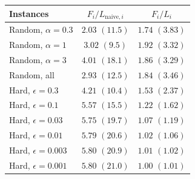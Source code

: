 \begin{tabular}{l|cc}
\toprule
Instances & $F_i / L_{\mathrm{naive}, i}$ & $F_i / L_i$ \\
\hline
Random, $\alpha = 0.3$ & $2.03$ $(11.5)$ & $1.74$ $(3.83)$ \\
Random, $\alpha = 1$ & $3.02$ $(9.5)$ & $1.92$ $(3.32)$ \\
Random, $\alpha = 3$ & $4.01$ $(18.1)$ & $1.86$ $(3.29)$ \\
Random, all & $2.93$ $(12.5)$ & $1.84$ $(3.46)$ \\
\hline
Hard, $\epsilon = 0.3$ & $4.21$ $(10.4)$ & $1.53$ $(2.37)$ \\
Hard, $\epsilon = 0.1$ & $5.57$ $(15.5)$ & $1.22$ $(1.62)$ \\
Hard, $\epsilon = 0.03$ & $5.75$ $(19.7)$ & $1.07$ $(1.19)$ \\
Hard, $\epsilon = 0.01$ & $5.79$ $(20.6)$ & $1.02$ $(1.06)$ \\
Hard, $\epsilon = 0.003$ & $5.80$ $(20.9)$ & $1.01$ $(1.02)$ \\
Hard, $\epsilon = 0.001$ & $5.80$ $(21.0)$ & $1.00$ $(1.01)$ \\
\bottomrule
\end{tabular}
